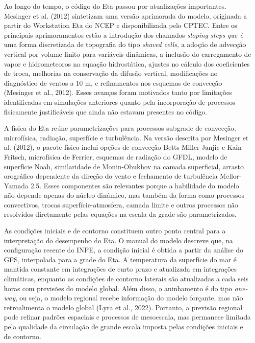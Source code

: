 \documentclass[12pt,a4paper,oneside]{book}
\begin{document}
Ao longo do tempo, o código do Eta passou por atualizações importantes. Mesinger et al. (2012) sintetizam uma versão aprimorada do modelo, originada a partir do Workstation Eta do NCEP e disponibilizada pelo CPTEC. Entre os principais aprimoramentos estão a introdução dos chamados \emph{sloping steps que é} uma forma discretizada de topografia do tipo \emph{shaved cells,} a adoção de advecção vertical por volume finito para variáveis dinâmicas, a inclusão do carregamento de vapor e hidrometeoros na equação hidrostática, ajustes no cálculo dos coeficientes de troca, melhorias na conservação da difusão vertical, modificações no diagnóstico de ventos a 10 m, e refinamentos nos esquemas de convecção (Mesinger et al., 2012). Esses avanços foram motivados tanto por limitações identificadas em simulações anteriores quanto pela incorporação de processos fisicamente justificáveis que ainda não estavam presentes no código.

A física do Eta reúne parametrizações para processos subgrade de convecção, microfísica, radiação, superfície e turbulência. Na versão descrita por Mesinger et al. (2012), o pacote físico inclui opções de convecção Betts-Miller-Janjic e Kain-Fritsch, microfísica de Ferrier, esquemas de radiação do GFDL, modelo de superfície Noah, similaridade de Monin-Obukhov na camada superficial, arrasto orográfico dependente da direção do vento e fechamento de turbulência Mellor-Yamada 2.5. Esses componentes são relevantes porque a habilidade do modelo não depende apenas do núcleo dinâmico, mas também da forma como processos convectivos, trocas superfície-atmosfera, camada limite e outros processos não resolvidos diretamente pelas equações na escala da grade são parametrizados.

As condições iniciais e de contorno constituem outro ponto central para a interpretação do desempenho do Eta. O manual do modelo descreve que, na configuração recente do INPE, a condição inicial é obtida a partir da análise do GFS, interpolada para a grade do Eta. A temperatura da superfície do mar é mantida constante em integrações de curto prazo e atualizada em integrações climáticas, enquanto as condições de contorno laterais são atualizadas a cada seis horas com previsões do modelo global. Além disso, o aninhamento é do tipo \emph{one-way}, ou seja, o modelo regional recebe informação do modelo forçante, mas não retroalimenta o modelo global (Lyra et al., 2022). Portanto, a previsão regional pode refinar padrões espaciais e processos de mesoescala, mas permanece limitada pela qualidade da circulação de grande escala imposta pelas condições iniciais e de contorno.
\end{document}
